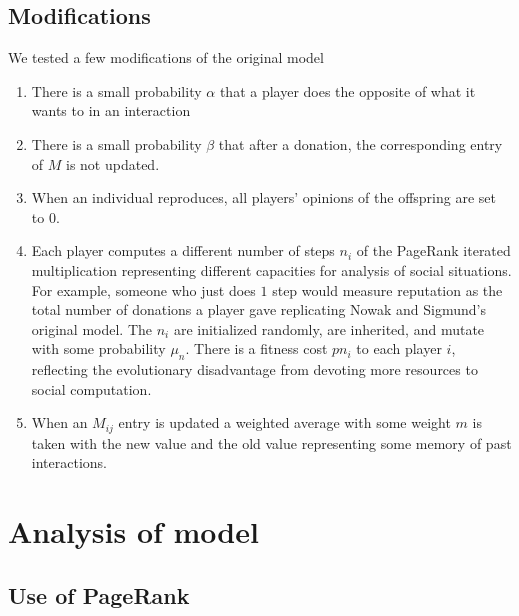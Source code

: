 \documentclass{amsart}
\begin{document}
\subsection{Modifications}
We tested a few modifications of the original model
\begin{enumerate}
\item
There is a small probability $\alpha$ that a player does the opposite
of what it wants to in an interaction
\item
There is a small probability $\beta$ that after a donation, the
corresponding entry of $M$ is not updated.
\item
When an individual reproduces, all players' opinions of the offspring
are set to 0.
\item
Each player computes a different number of steps $n_i$ of the PageRank
iterated multiplication representing different capacities for analysis
of social situations. For example, someone who just does $1$ step
would measure reputation as the total number of donations a player
gave replicating Nowak and Sigmund's original model. The $n_i$ are
initialized randomly, are inherited, and mutate with some probability
$\mu_n$. There is a fitness cost $p n_i$ to each player $i$,
reflecting the evolutionary disadvantage from devoting more resources
to social computation.
\item
When an $M_{ij}$ entry is updated a weighted average with some weight
$m$ is taken with the new value and the old value representing some
memory of past interactions.
\end{enumerate}

\section{Analysis of model}
\label{sec:analysis}

\subsection{Use of PageRank}
\label{sec:whypagerank}
\end{document}
